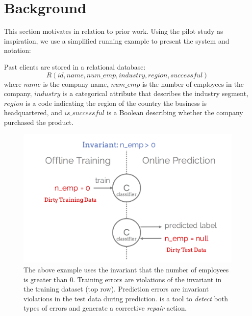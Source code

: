 
\section{Background}
This section motivates \sys in relation to prior work.
Using the pilot study as inspiration, we use a simplified running example to present the system and notation:
\begin{example}\sloppy\label{ex:lead}
Past clients are stored in a relational database:
\[
R(id, name, num\_emp, industry, region, successful)
\]
where $name$ is the company name, $num\_emp$ is the number of employees in the company, $industry$ is a categorical attribute that describes the industry segment, $region$ is a code indicating the region of the country the business is headquartered, and $is\_successful$ is a Boolean describing whether the company purchased the product.
\end{example}

\begin{figure}[t]
\centering
 \includegraphics[width=\columnwidth]{figures/training_and_pred_errors.png}
 \caption{The above example uses the invariant that the number of employees is greater than $0$.  Training errors are violations of the invariant in the training dataset (top row). Prediction errors are invariant violations in the test data during prediction. \sys is a tool to {\it detect} both types of errors and generate a corrective {\it repair} action.
 \label{fig:error}}
\end{figure}

